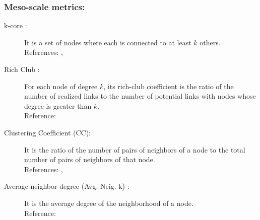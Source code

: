  \subsubsection{Meso-scale metrics:}
 \begin{description}
     
\item[ k-core :] It is a set of nodes where each is connected to at least $k$ others.   \\
   References:  \cite{Newman2010}, \cite{Morone2019TheEcosystems} 
\item[ Rich Club :] For each node of degree $k$, its rich-club coefficient is the ratio of the number of realized links to the number of potential links with nodes whose degree is greater than $k$. \\
   Reference:   \cite{McAuley2007Rich-clubHierarchies}  
\item[Clustering Coefficient  (CC):]  It is the ratio of the number of pairs of neighbors of a node to the total number of pairs of neighbors of that node.    \\
   References: \cite{Newman2010},\cite{Estrada2007CharacterizationSpecies} 
\item[ Average neighbor degree  (Avg. Neig. k) :]  
 It is the average degree of the neighborhood of a node.  \\
   Reference:  \cite{Barrat2004TheNetworks}  
   \end{description}


